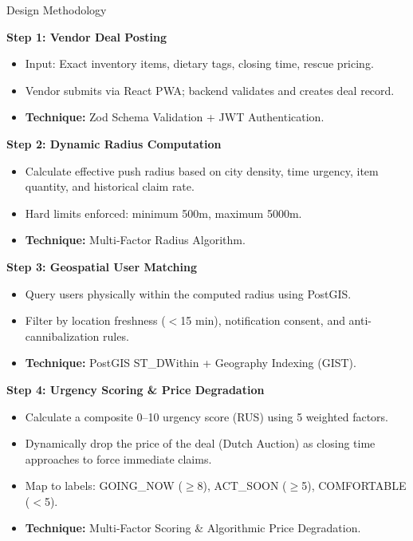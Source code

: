 \documentclass[aspectratio=169,xcolor=dvipsnames]{beamer}
\begin{document}
\begin{frame}{Design Methodology}
\justifying
\scriptsize
\setlength{\itemsep}{1pt}
\setlength{\parskip}{0pt}

\textbf{Step 1: Vendor Deal Posting}
\begin{itemize}
    \item Input: Exact inventory items, dietary tags, closing time, rescue pricing.
    \item Vendor submits via React PWA; backend validates and creates deal record.
    \item \textbf{Technique:} Zod Schema Validation + JWT Authentication.
\end{itemize}

\vspace{0.05cm}

\textbf{Step 2: Dynamic Radius Computation}
\begin{itemize}
    \item Calculate effective push radius based on city density, time urgency, item quantity, and historical claim rate.
    \item Hard limits enforced: minimum 500m, maximum 5000m.
    \item \textbf{Technique:} Multi-Factor Radius Algorithm.
\end{itemize}

\vspace{0.05cm}

\textbf{Step 3: Geospatial User Matching}
\begin{itemize}
    \item Query users physically within the computed radius using PostGIS.
    \item Filter by location freshness ($<$15 min), notification consent, and anti-cannibalization rules.
    \item \textbf{Technique:} PostGIS ST\_DWithin + Geography Indexing (GIST).
\end{itemize}

\vspace{0.05cm}

\textbf{Step 4: Urgency Scoring \& Price Degradation}
\begin{itemize}
    \item Calculate a composite 0--10 urgency score (RUS) using 5 weighted factors.
    \item Dynamically drop the price of the deal (Dutch Auction) as closing time approaches to force immediate claims.
    \item Map to labels: GOING\_NOW ($\geq$8), ACT\_SOON ($\geq$5), COMFORTABLE ($<$5).
    \item \textbf{Technique:} Multi-Factor Scoring \& Algorithmic Price Degradation.
\end{itemize}

\end{frame}
\end{document}
